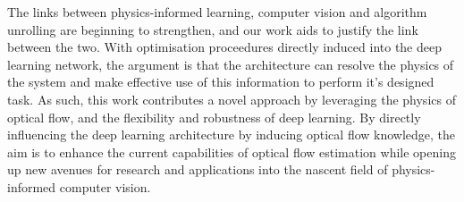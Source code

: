 \IEEEPARstart{}{} The links between physics-informed learning, computer vision and algorithm unrolling are beginning to strengthen, and our work aids to justify the link between the two. With optimisation proceedures directly induced into the deep learning network, the argument is that the architecture can resolve the physics of the system and make effective use of this information to perform it's designed task. As such, this work contributes a novel approach by leveraging the physics of optical flow, and the flexibility and robustness of deep learning. By directly influencing the deep learning architecture by inducing optical flow knowledge, the aim is to enhance the current capabilities of optical flow estimation while opening up new avenues for research and applications into the nascent field of physics-informed computer vision.
